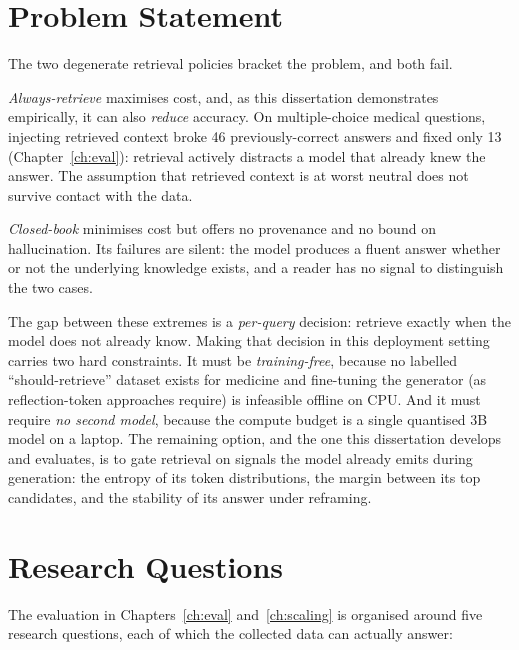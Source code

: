 \section{Problem Statement}
\label{sec:intro-problem}

The two degenerate retrieval policies bracket the problem, and both fail.

\emph{Always-retrieve} maximises cost, and, as this dissertation
demonstrates empirically, it can also \emph{reduce} accuracy. On
multiple-choice medical questions, injecting retrieved context broke 46
previously-correct answers and fixed only 13 (Chapter~\ref{ch:eval}):
retrieval actively distracts a model that already knew the answer. The
assumption that retrieved context is at worst neutral does not survive contact
with the data.

\emph{Closed-book} minimises cost but offers no provenance and no bound on
hallucination. Its failures are silent: the model produces a fluent answer
whether or not the underlying knowledge exists, and a reader has no signal to
distinguish the two cases.

The gap between these extremes is a \emph{per-query} decision: retrieve
exactly when the model does not already know. Making that decision in this
deployment setting carries two hard constraints. It must be
\emph{training-free}, because no labelled ``should-retrieve'' dataset exists
for medicine and fine-tuning the generator (as reflection-token approaches
require) is infeasible offline on CPU. And it must require \emph{no second
model}, because the compute budget is a single quantised 3B model on a
laptop. The remaining option, and the one this dissertation develops and
evaluates, is to gate retrieval on signals the model already emits during
generation: the entropy of its token distributions, the margin between its top
candidates, and the stability of its answer under reframing.

\section{Research Questions}
\label{sec:intro-rqs}

The evaluation in Chapters~\ref{ch:eval} and~\ref{ch:scaling} is organised
around five research questions, each of which the collected data can
actually answer:

